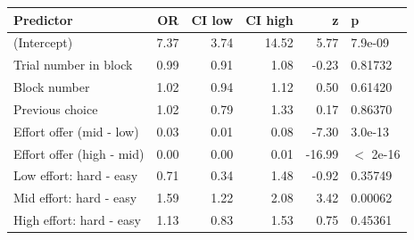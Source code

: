 \begin{table}[ht]
\centering
\begin{tabular}{lrrrrl}
  \hline
Predictor & OR & CI low & CI high & z & p \\ 
  \hline
(Intercept) & 7.37 & 3.74 & 14.52 & 5.77 & 7.9e-09 \\ 
  Trial number in block & 0.99 & 0.91 & 1.08 & -0.23 & 0.81732 \\ 
  Block number & 1.02 & 0.94 & 1.12 & 0.50 & 0.61420 \\ 
  Previous choice & 1.02 & 0.79 & 1.33 & 0.17 & 0.86370 \\ 
  Effort offer (mid - low) & 0.03 & 0.01 & 0.08 & -7.30 & 3.0e-13 \\ 
  Effort offer (high - mid) & 0.00 & 0.00 & 0.01 & -16.99 & $<$ 2e-16 \\ 
  Low effort: hard - easy & 0.71 & 0.34 & 1.48 & -0.92 & 0.35749 \\ 
  Mid effort: hard - easy & 1.59 & 1.22 & 2.08 & 3.42 & 0.00062 \\ 
  High effort: hard - easy & 1.13 & 0.83 & 1.53 & 0.75 & 0.45361 \\ 
   \hline
\end{tabular}
\end{table}
